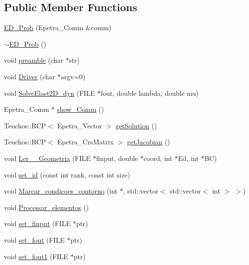 \subsection*{Public Member Functions}
\begin{DoxyCompactItemize}
\item 
\hyperlink{classED__Prob_aaec17f928041e3205d2817d066b80246}{E\+D\+\_\+\+Prob} (Epetra\+\_\+\+Comm \&comm)
\item 
\hyperlink{classED__Prob_a5d319253f12aa320c70907af6ad19d7a}{$\sim$\+E\+D\+\_\+\+Prob} ()
\item 
void \hyperlink{classED__Prob_a2530abb5eba122a90a2bae601893ddfc}{preamble} (char $\ast$str)
\item 
void \hyperlink{classED__Prob_a1511a0a4eb81a3958d13ebe741b8d49c}{Driver} (char $\ast$argv=0)
\item 
void \hyperlink{classED__Prob_a587cd05e1422af94fadd3eb73a8974b0}{Solve\+Elast2\+D\+\_\+dyn} (F\+I\+LE $\ast$fout, double lambda, double mu)
\item 
Epetra\+\_\+\+Comm $\ast$ \hyperlink{classGeProb_a810c17dc99110efbb57b8ad28adc5cb7}{show\+\_\+\+Comm} ()
\item 
Teuchos\+::\+R\+CP$<$ Epetra\+\_\+\+Vector $>$ \hyperlink{classGeProb_ae29860923e40758aa1a7810556bb0f8e}{get\+Solution} ()
\item 
Teuchos\+::\+R\+CP$<$ Epetra\+\_\+\+Crs\+Matrix $>$ \hyperlink{classGeProb_a5c8159fd807c26eaec5c0a9fa72636f6}{get\+Jacobian} ()
\item 
void \hyperlink{classGeProb_a1b1545b917023458df409bd97573bac5}{Ler\+\_\+\+\_\+\+Geometria} (F\+I\+LE $\ast$finput, double $\ast$coord, int $\ast$Ed, int $\ast$BC)
\item 
void \hyperlink{classGeProb_ae922c4a2ec2974c44cbcfa02e56855db}{set\+\_\+id} (const int rank, const int size)
\item 
void \hyperlink{classGeProb_a6fc2ba08f7556408bd9082ed34ada7bd}{Marcar\+\_\+condicoes\+\_\+contorno} (int $\ast$, std\+::vector$<$ std\+::vector$<$ int $>$ $>$)
\item 
void \hyperlink{classGeProb_abe608186b9102498672c115584169d9a}{Processar\+\_\+elementos} ()
\item 
void \hyperlink{classGeProb_adc17f3e57dab093882ec7f7aebea634f}{set\+\_\+finput} (F\+I\+LE $\ast$ptr)
\item 
void \hyperlink{classGeProb_adba307125006b1f5e0bd9a04e05cecf2}{set\+\_\+fout} (F\+I\+LE $\ast$ptr)
\item 
void \hyperlink{classGeProb_a75433e7f3aec6d8f0746cd3e0e82db96}{set\+\_\+fout1} (F\+I\+LE $\ast$ptr)

\end{DoxyCompactItemize}
